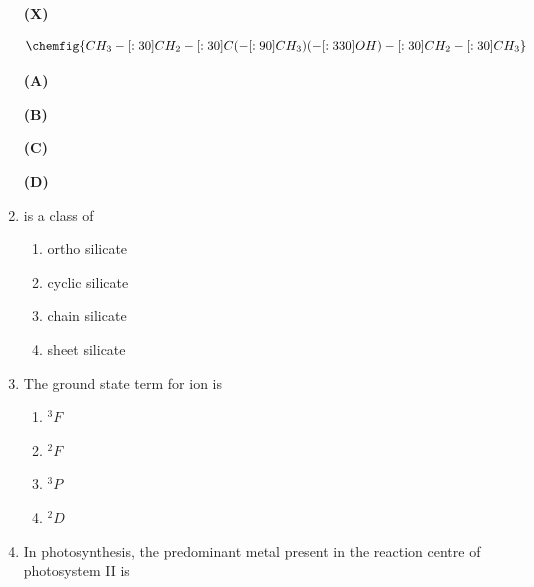 \documentclass[journal,12pt,onecolumn]{IEEEtran}
\theoremstyle{remark}
\begin{document}
\begin{enumerate}
  

\textbf{(X)}

\[
\chemfig{CH_3-[:30]CH_2-[:30]C(-[:90]CH_3)(-[:330]OH)-[:30]CH_2-[:30]CH_3}
\]

 

\begin{multicols}{2}
\noindent
\textbf{(A)} \\

  

\noindent
\textbf{(B)} \\

  

\noindent
\textbf{(C)} \\

  

\noindent
\textbf{(D)} \\

\end{multicols}

\item {} is a class of \hfill{}
\begin{multicols}{4}
    

\begin{enumerate}
     \item   ortho silicate
     \item   cyclic silicate
     \item   chain silicate
     \item   sheet silicate
\end{enumerate}
\end{multicols}
 

\item The ground state term for  ion is \hfill{}
\begin{multicols}{4}
\begin{enumerate}
     \item   $^3F$
     \item   $^2F$
     \item   $^3P$
     \item   $^2D$
\end{enumerate}
\end{multicols}
 

\item In photosynthesis, the predominant metal present in the reaction centre of photosystem II is \hfill{}
\begin{multicols}{4}
    


\end{multicols}
\end{enumerate}
\end{document}
